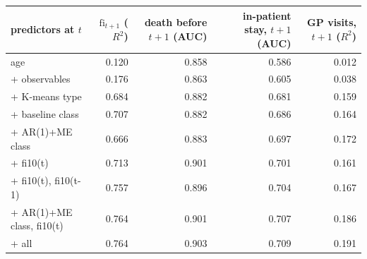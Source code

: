 \begin{tabular}{lrrrr}
\toprule
predictors at $t$ & $\mathrm{fi}_{t+1}$ ($R^2$) & death before $t+1$ (AUC) & in-patient stay, $t+1$ (AUC) & GP visits, $t+1$ ($R^2$) \\
\midrule
age & 0.120 & 0.858 & 0.586 & 0.012 \\
+ observables & 0.176 & 0.863 & 0.605 & 0.038 \\
+ K-means type & 0.684 & 0.882 & 0.681 & 0.159 \\
+ baseline class & 0.707 & 0.882 & 0.686 & 0.164 \\
+ AR(1)+ME class & 0.666 & 0.883 & 0.697 & 0.172 \\
+ fi10(t) & 0.713 & 0.901 & 0.701 & 0.161 \\
+ fi10(t), fi10(t-1) & 0.757 & 0.896 & 0.704 & 0.167 \\
+ AR(1)+ME class, fi10(t) & 0.764 & 0.901 & 0.707 & 0.186 \\
+ all & 0.764 & 0.903 & 0.709 & 0.191 \\
\bottomrule
\end{tabular}
